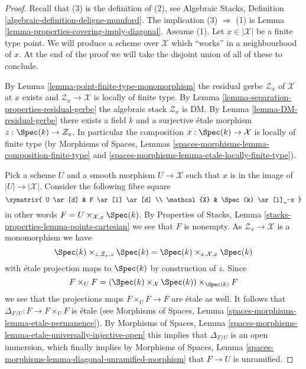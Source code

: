 \begin{proof}
Recall that (3) is the definition of (2), see
Algebraic Stacks, Definition \ref{algebraic-definition-deligne-mumford}.
The implication (3) $\Rightarrow$ (1) is
Lemma \ref{lemma-properties-covering-imply-diagonal}.
Assume (1). Let $x \in |\mathcal{X}|$ be a finite type point.
We will produce a scheme over $\mathcal{X}$ which ``works'' in a
neighbourhood of $x$. At the end of the proof we will take the disjoint
union of all of these to conclude.

\medskip\noindent
By
Lemma \ref{lemma-point-finite-type-monomorphism}
the residual gerbe $\mathcal{Z}_x$ of $\mathcal{X}$ at $x$ exists and
$\mathcal{Z}_x \to \mathcal{X}$ is locally of finite type. By
Lemma \ref{lemma-separation-properties-residual-gerbe}
the algebraic stack $\mathcal{Z}_x$ is DM. By
Lemma \ref{lemma-DM-residual-gerbe}
there exists a field $k$ and a surjective \'etale morphism
$z : \Spec(k) \to \mathcal{Z}_x$.
In particular the composition $x : \Spec(k) \to \mathcal{X}$
is locally of finite type (by
Morphisms of Spaces, Lemmas
\ref{spaces-morphisms-lemma-composition-finite-type} and
\ref{spaces-morphisms-lemma-etale-locally-finite-type}).

\medskip\noindent
Pick a scheme $U$ and a smooth morphism $U \to \mathcal{X}$ such that
$x$ is in the image of $|U| \to |\mathcal{X}|$.
Consider the following fibre square
$$
\xymatrix{
U \ar[d] & F  \ar[l] \ar[d] \\
\mathcal{X} & \Spec(k) \ar[l]_-x
}
$$
in other words $F = U \times_{\mathcal{X}, x} \Spec(k)$. By
Properties of Stacks, Lemma \ref{stacks-properties-lemma-points-cartesian}
we see that $F$ is nonempty.
As $\mathcal{Z}_x \to \mathcal{X}$ is a monomorphism we have
$$
\Spec(k) \times_{z, \mathcal{Z}_x, z} \Spec(k)
=
\Spec(k) \times_{x, \mathcal{X}, x} \Spec(k)
$$
with \'etale projection maps to $\Spec(k)$ by construction of $z$.
Since
$$
F \times_U F =
(\Spec(k) \times_\mathcal{X} \Spec(k))
\times_{\Spec(k)} F
$$
we see that the projections maps $F \times_U F \to F$ are \'etale as well.
It follows that $\Delta_{F/U} : F \to F \times_U F$ is \'etale (see
Morphisms of Spaces, Lemma \ref{spaces-morphisms-lemma-etale-permanence}).
By
Morphisms of Spaces, Lemma
\ref{spaces-morphisms-lemma-etale-universally-injective-open}
this implies that $\Delta_{F/U}$ is an open immersion, which finally
implies by
Morphisms of Spaces, Lemma
\ref{spaces-morphisms-lemma-diagonal-unramified-morphism}
that $F \to U$ is unramified.


\end{proof}

